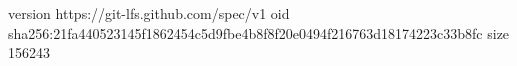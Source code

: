 version https://git-lfs.github.com/spec/v1
oid sha256:21fa440523145f1862454c5d9fbe4b8f8f20e0494f216763d18174223c33b8fc
size 156243
